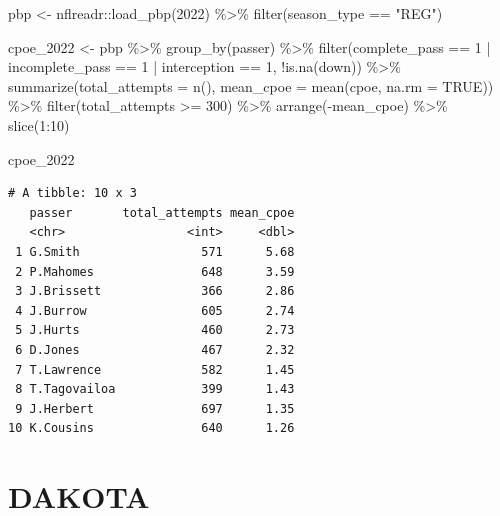 \documentclass[
  letterpaper,
]{krantz}
\newenvironment{Shaded}{\begin{snugshade}}{\end{snugshade}}
\newcommand{\AttributeTok}[1]{\textcolor[rgb]{0.40,0.45,0.13}{#1}}
\newcommand{\ConstantTok}[1]{\textcolor[rgb]{0.56,0.35,0.01}{#1}}
\newcommand{\DecValTok}[1]{\textcolor[rgb]{0.68,0.00,0.00}{#1}}
\newcommand{\FunctionTok}[1]{\textcolor[rgb]{0.28,0.35,0.67}{#1}}
\newcommand{\NormalTok}[1]{\textcolor[rgb]{0.00,0.23,0.31}{#1}}
\newcommand{\OtherTok}[1]{\textcolor[rgb]{0.00,0.23,0.31}{#1}}
\newcommand{\SpecialCharTok}[1]{\textcolor[rgb]{0.37,0.37,0.37}{#1}}
\newcommand{\StringTok}[1]{\textcolor[rgb]{0.13,0.47,0.30}{#1}}
\begin{document}
\begin{Shaded}
\begin{Highlighting}[]
\NormalTok{pbp }\OtherTok{\textless{}{-}}\NormalTok{ nflreadr}\SpecialCharTok{::}\FunctionTok{load\_pbp}\NormalTok{(}\DecValTok{2022}\NormalTok{) }\SpecialCharTok{\%\textgreater{}\%}
  \FunctionTok{filter}\NormalTok{(season\_type }\SpecialCharTok{==} \StringTok{"REG"}\NormalTok{)}

\NormalTok{cpoe\_2022 }\OtherTok{\textless{}{-}}\NormalTok{ pbp }\SpecialCharTok{\%\textgreater{}\%}
  \FunctionTok{group\_by}\NormalTok{(passer) }\SpecialCharTok{\%\textgreater{}\%}
  \FunctionTok{filter}\NormalTok{(complete\_pass }\SpecialCharTok{==} \DecValTok{1} \SpecialCharTok{|}
\NormalTok{           incomplete\_pass }\SpecialCharTok{==} \DecValTok{1} \SpecialCharTok{|}
\NormalTok{           interception }\SpecialCharTok{==} \DecValTok{1}\NormalTok{,}
         \SpecialCharTok{!}\FunctionTok{is.na}\NormalTok{(down)) }\SpecialCharTok{\%\textgreater{}\%}
  \FunctionTok{summarize}\NormalTok{(}\AttributeTok{total\_attempts =} \FunctionTok{n}\NormalTok{(),}
            \AttributeTok{mean\_cpoe =} \FunctionTok{mean}\NormalTok{(cpoe, }\AttributeTok{na.rm =} \ConstantTok{TRUE}\NormalTok{)) }\SpecialCharTok{\%\textgreater{}\%}
  \FunctionTok{filter}\NormalTok{(total\_attempts }\SpecialCharTok{\textgreater{}=} \DecValTok{300}\NormalTok{) }\SpecialCharTok{\%\textgreater{}\%}
  \FunctionTok{arrange}\NormalTok{(}\SpecialCharTok{{-}}\NormalTok{mean\_cpoe) }\SpecialCharTok{\%\textgreater{}\%}
  \FunctionTok{slice}\NormalTok{(}\DecValTok{1}\SpecialCharTok{:}\DecValTok{10}\NormalTok{)}

\NormalTok{cpoe\_2022}
\end{Highlighting}
\end{Shaded}

\begin{verbatim}
# A tibble: 10 x 3
   passer       total_attempts mean_cpoe
   <chr>                 <int>     <dbl>
 1 G.Smith                 571      5.68
 2 P.Mahomes               648      3.59
 3 J.Brissett              366      2.86
 4 J.Burrow                605      2.74
 5 J.Hurts                 460      2.73
 6 D.Jones                 467      2.32
 7 T.Lawrence              582      1.45
 8 T.Tagovailoa            399      1.43
 9 J.Herbert               697      1.35
10 K.Cousins               640      1.26
\end{verbatim}

\hypertarget{dakota}{%
\section{DAKOTA}\label{dakota}}
\end{document}
